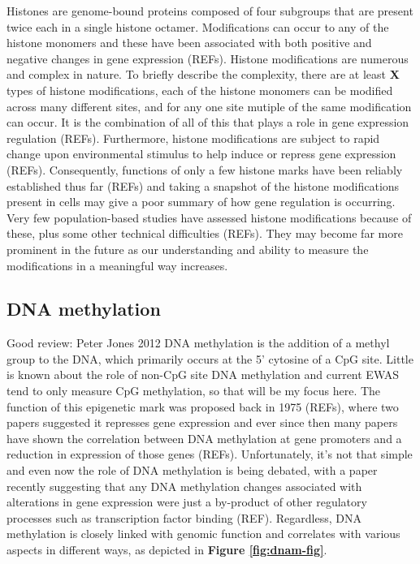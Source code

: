 \documentclass[11pt,twoside]{bristolthesis}
\begin{document}
Histones are genome-bound proteins composed of four subgroups that are present twice each in a single histone octamer. Modifications can occur to any of the histone monomers and these have been associated with both positive and negative changes in gene expression (REFs). Histone modifications are numerous and complex in nature. To briefly describe the complexity, there are at least \textbf{X} types of histone modifications, each of the histone monomers can be modified across many different sites, and for any one site mutiple of the same modification can occur. It is the combination of all of this that plays a role in gene expression regulation (REFs). Furthermore, histone modifications are subject to rapid change upon environmental stimulus to help induce or repress gene expression (REFs). Consequently, functions of only a few histone marks have been reliably established thus far (REFs) and taking a snapshot of the histone modifications present in cells may give a poor summary of how gene regulation is occurring. Very few population-based studies have assessed histone modifications because of these, plus some other technical difficulties (REFs). They may become far more prominent in the future as our understanding and ability to measure the modifications in a meaningful way increases.

\hypertarget{dna-methylation}{%
\subsection{DNA methylation}\label{dna-methylation}}

Good review: Peter Jones 2012
DNA methylation is the addition of a methyl group to the DNA, which primarily occurs at the 5' cytosine of a CpG site. Little is known about the role of non-CpG site DNA methylation and current EWAS tend to only measure CpG methylation, so that will be my focus here. The function of this epigenetic mark was proposed back in 1975 (REFs), where two papers suggested it represses gene expression and ever since then many papers have shown the correlation between DNA methylation at gene promoters and a reduction in expression of those genes (REFs). Unfortunately, it's not that simple and even now the role of DNA methylation is being debated, with a paper recently suggesting that any DNA methylation changes associated with alterations in gene expression were just a by-product of other regulatory processes such as transcription factor binding (REF). Regardless, DNA methylation is closely linked with genomic function and correlates with various aspects in different ways, as depicted in \textbf{Figure \ref{fig:dnam-fig}}.
\end{document}
